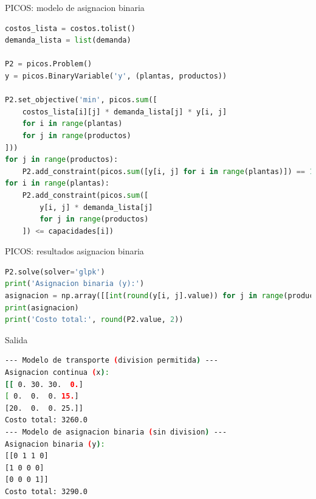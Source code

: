 \documentclass{beamer}
\begin{document}
\begin{frame}[fragile]{PICOS: modelo de asignacion binaria}
    \begin{lstlisting}[language=Python]
costos_lista = costos.tolist()
demanda_lista = list(demanda)

P2 = picos.Problem()
y = picos.BinaryVariable('y', (plantas, productos))

P2.set_objective('min', picos.sum([
    costos_lista[i][j] * demanda_lista[j] * y[i, j]
    for i in range(plantas)
    for j in range(productos)
]))
for j in range(productos):
    P2.add_constraint(picos.sum([y[i, j] for i in range(plantas)]) == 1)
for i in range(plantas):
    P2.add_constraint(picos.sum([
        y[i, j] * demanda_lista[j]
        for j in range(productos)
    ]) <= capacidades[i])
    \end{lstlisting}
\end{frame}

\begin{frame}[fragile]{PICOS: resultados asignacion binaria}
    \begin{lstlisting}[language=Python]
P2.solve(solver='glpk')
print('Asignacion binaria (y):')
asignacion = np.array([[int(round(y[i, j].value)) for j in range(productos)] for i in range(plantas)])
print(asignacion)
print('Costo total:', round(P2.value, 2))
    \end{lstlisting}
\end{frame}

\begin{frame}[fragile]{Salida}
    \begin{lstlisting}[language=bash,backgroundcolor=\color{black},basicstyle=\color{white}\ttfamily,numbers=none]
--- Modelo de transporte (division permitida) ---
Asignacion continua (x):
[[ 0. 30. 30.  0.]
[ 0.  0.  0. 15.]
[20.  0.  0. 25.]]
Costo total: 3260.0
--- Modelo de asignacion binaria (sin division) ---
Asignacion binaria (y):
[[0 1 1 0]
[1 0 0 0]
[0 0 0 1]]
Costo total: 3290.0
    \end{lstlisting}
\end{frame}
\end{document}
